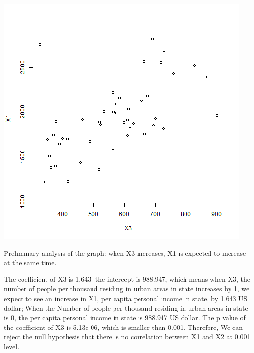 \documentclass[12pt,letterpaper]{article}
\begin{document}
\begin{itemize}
\includegraphics[scale=.80]{X1 ~ X3.png}

Preliminary analysis of the graph: when X3 increases, X1 is expected to increase at the same time.

The coefficient of X3 is 1.643, the intercept is 988.947, which means when X3, the number of people per thousand residing in urban areas in state increases by 1, we expect to see an increase in X1, per capita personal income in state, by 1.643 US dollar; When the Number of people per thousand residing in urban areas in state is 0, the per capita personal income in state is 988.947 US dollar.
The p value of the coefficient of X3 is 5.13e-06, which is smaller than 0.001. Therefore, We can reject the null hypothesis that there is no correlation between X1 and X2 at 0.001 level.



 


\end{itemize}
\end{document}
